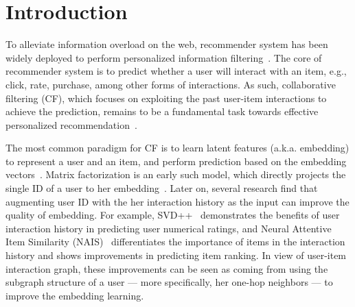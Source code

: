 \section{Introduction}
To alleviate information overload on the web, recommender system has been widely deployed to perform personalized information filtering~\cite{PinSage,YoutubeRS, PeterRec}.
The core of recommender system is to predict whether a user will interact with an item, e.g., click, rate, purchase, among other forms of interactions. As such, collaborative filtering (CF), which focuses on exploiting the past user-item interactions to achieve the prediction, remains to be a fundamental task towards effective personalized recommendation~\cite{NCF,VACF,NGCF,CMN}. 

The most common paradigm for CF is to learn latent features (a.k.a. embedding) to represent a user and an item, and perform prediction based on the embedding vectors~\cite{NCF,DBLP:conf/www/ChengDZK18}.
Matrix factorization is an early such model, which directly projects the single ID of a user to her embedding~\cite{MF}.  Later on, several research find that augmenting user ID with the her interaction history as the input can improve the quality of embedding. For example, SVD++~\cite{SVD++} demonstrates the benefits of user interaction history in predicting user numerical ratings, and Neural Attentive Item Similarity (NAIS)~\cite{NAIS} differentiates the importance of items in the interaction history and shows improvements in predicting item ranking. 
In view of user-item interaction graph, these improvements can be seen as coming from using the subgraph structure of a user --- more specifically, her one-hop neighbors --- to improve the embedding learning. 

